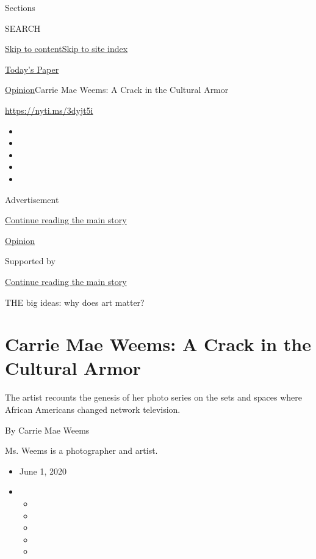 Sections

SEARCH

\protect\hyperlink{site-content}{Skip to
content}\protect\hyperlink{site-index}{Skip to site index}

\href{https://myaccount.nytimes3xbfgragh.onion/auth/login?response_type=cookie\&client_id=vi}{}

\href{https://www.nytimes3xbfgragh.onion/section/todayspaper}{Today's
Paper}

\href{/section/opinion}{Opinion}\textbar{}Carrie Mae Weems: A Crack in
the Cultural Armor

\url{https://nyti.ms/3dyjt5i}

\begin{itemize}
\item
\item
\item
\item
\item
\end{itemize}

Advertisement

\protect\hyperlink{after-top}{Continue reading the main story}

\href{/section/opinion}{Opinion}

Supported by

\protect\hyperlink{after-sponsor}{Continue reading the main story}

THE big ideas: why does art matter?

\hypertarget{carrie-mae-weems-a-crack-in-the-cultural-armor}{%
\section{Carrie Mae Weems: A Crack in the Cultural
Armor}\label{carrie-mae-weems-a-crack-in-the-cultural-armor}}

The artist recounts the genesis of her photo series on the sets and
spaces where African Americans changed network television.

By Carrie Mae Weems

Ms. Weems is a photographer and artist.

\begin{itemize}
\item
  June 1, 2020
\item
  \begin{itemize}
  \item
  \item
  \item
  \item
  \item
  \end{itemize}
\end{itemize}

